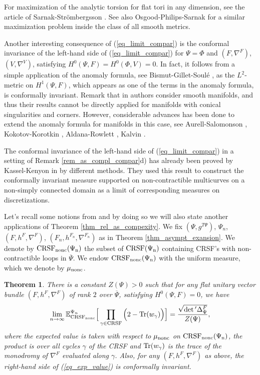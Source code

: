 \documentclass[12pt]{article}
\numberwithin{equation}{section}
\theoremstyle{theorem}
\newtheorem{thm}{Theorem}[section]
\theoremstyle{definition}
\theoremstyle{remark}
\newcommand{\laplcomp}{\Delta}
\begin{document}
	For maximization of the analytic torsion for flat tori in any dimension, see the article of Sarnak-Strömbergsson \cite[Theorems 1, 2]{SarnakStrombergsson}.
	See also Osgood-Philips-Sarnak \cite{OPS1} for a similar maximization problem inside the class of all smooth metrics.
	\par 
	Another interesting consequence of (\ref{eq_limit_compar}) is the conformal invariance of the left-hand side of (\ref{eq_limit_compar}) for $\Psi = \Phi$ and $(F, \nabla^F)$, $(V, \nabla^V)$, satisfying $H^0(\Psi, F) = H^0(\Phi, V) = 0$.
	In fact, it follows from a simple application of the anomaly formula, see Bismut-Gillet-Soulé \cite[Theorem 1.23]{BGS3}, as the $L^2$-metric on $H^1(\Psi, F)$, which appears as one of the terms in the anomaly formula, is conformally invariant.
	Remark that in \cite{BGS3} authors consider smooth manifolds, and thus their results cannot be directly applied for manifolds with conical singularities and corners. However, considerable advances has been done to extend the anomaly formula for manifolds in this case, see Aurell-Salomonson \cite{AurellSalomon}, Kokotov-Korotkin \cite{KokKorDetFried}, Aldana-Rowlett \cite{AldRowl}, Kalvin \cite{KalvinPol}.
	\par 
	The conformal invariance of the left-hand side of (\ref{eq_limit_compar}) in a setting of Remark \ref{rem_as_compl_compar}d) has already been proved by Kassel-Kenyon in \cite[Theorem 17]{KassKenyon} by different methods. They used this result to construct the conformally invariant measure supported on non-contractible multicurves on a non-simply connected domain as a limit of corresponding measures on discretizations.
	\par 
	Let's recall some notions from  \cite{KassKenyon} and by doing so we will also state another applications of Theorem \ref{thm_rel_as_compexity}.
	We fix $(\Psi, g^{T \Psi})$, $\Psi_n$, $(F, h^F, \nabla^F)$, $(F_n, h^{F_n}, \nabla^{F_n})$ as in Theorem \ref{thm_asympt_exansion}.
	We denote by $\rm{CRSF}_{{\rm{nonc}}}(\Psi_n)$ the subset of $\rm{CRSF}(\Psi_n)$ containing CRSF's with non-contractible loops in $\overline{\Psi}$.
	We endow $\rm{CRSF}_{{\rm{nonc}}}(\Psi_n)$ with the uniform measure, which we denote by $\mu_{{\rm{nonc}}}$.
	\begin{thm}\label{thm_exp_value}
		There is a constant $Z(\Psi) > 0$ such that for any flat unitary vector bundle $(F, h^F, \nabla^F)$ of rank $2$ over $\overline{\Psi}$, satisfying $H^0(\Psi, F) = 0$, we have
		\begin{equation}\label{eq_exp_value}
			\lim_{n \to \infty} \mathbb{E}_{\rm{CRSF}_{{\rm{nonc}}}}^{\Psi_n} 
			\Big[
				\prod_{\gamma \in {\rm{CRSF}}} 
				\Big( 2 - {\rm{Tr}}(w_{\gamma}) \Big)
			\Big]
			=
			\frac{\sqrt{\smash[b]{\det{}' \laplcomp_{\Psi}^{F}}}}{Z(\Psi)},
		\end{equation}
		where the expected value is taken with respect to $\mu_{{\rm{nonc}}}$ on $\rm{CRSF}_{{\rm{nonc}}}(\Psi_n)$, the product is over all cycles $\gamma$ of the CRSF and ${\rm{Tr}}(w_{\gamma})$ is the trace of the monodromy of $\nabla^F$ evaluated along $\gamma$.
		Also, for any $(F, h^F, \nabla^F)$ as above, the right-hand side of (\ref{eq_exp_value}) is conformally invariant.
	\end{thm}
\end{document}

